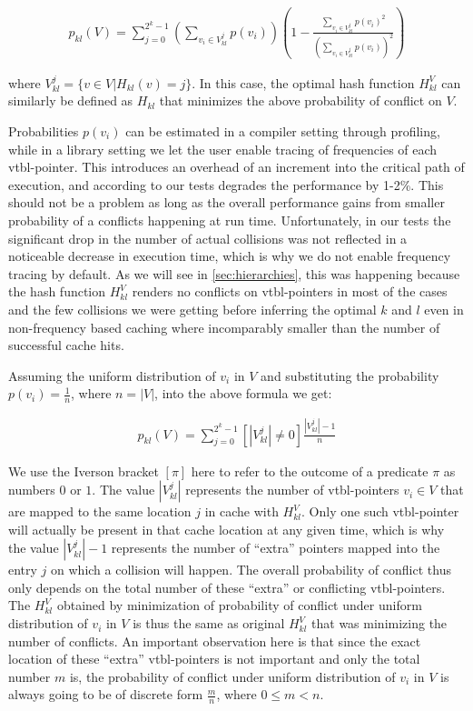\begin{eqnarray*}
p_{kl}(V)=\sum\limits_{j=0}^{2^k-1}(\sum\limits_{v_{i} \in V^j_{kl}}p(v_i))(1-\frac{\sum\limits_{v_i \in V^j_{kl}}p(v_i)^2}{(\sum\limits_{v_{i} \in V^j_{kl}}p(v_i))^2})
\end{eqnarray*}

\noindent 
where $V^j_{kl}=\{v \in V | H_{kl}(v)=j\}$. In this case, the optimal hash 
function $H_{kl}^V$ can similarly be defined as $H_{kl}$ that minimizes the 
above probability of conflict on $V$.

Probabilities $p(v_i)$ can be estimated in a compiler setting through profiling, 
while in a library setting we let the user enable tracing of frequencies of 
each vtbl-pointer. This introduces an overhead of an increment into the critical 
path of execution, and according to our tests degrades the performance by 1-2\%. 
This should not be a problem as long as the overall performance gains from 
smaller probability of a conflicts happening at run time. Unfortunately, in our 
tests the significant drop in the number of actual collisions was not reflected 
in a noticeable decrease in execution time, which is why we do not enable 
frequency tracing by default. As we will see in \textsection\ref{sec:hierarchies}, 
this was happening because the hash function $H_{kl}^V$ renders no conflicts on 
vtbl-pointers in most of the cases and the few collisions we were getting before 
inferring the optimal $k$ and $l$ even in non-frequency based caching where 
incomparably smaller than the number of successful cache hits.

Assuming the uniform distribution of $v_i$ in $V$ and substituting the probability 
$p(v_i)=\frac{1}{n}$, where $n=|V|$, into the above formula we get:

\begin{eqnarray*}
p_{kl}(V)=\sum\limits_{j=0}^{2^k-1}[|V^j_{kl}| \neq 0]\frac{|V^j_{kl}|-1}{n}
\end{eqnarray*}

\noindent
We use the Iverson bracket $[\pi]$ here to refer to the outcome of a predicate $\pi$ as numbers $0$ or $1$.
The value $|V^j_{kl}|$ represents the number of vtbl-pointers $v_i \in V$ that are mapped to the same location $j$ in cache with $H_{kl}^V$. Only 
one such vtbl-pointer will actually be present in that cache location at any given 
time, which is why the value $|V^j_{kl}|-1$ represents the number of ``extra'' 
pointers mapped into the entry $j$ on which a collision will happen. The overall 
probability of conflict thus only depends on the total number of these ``extra'' 
or conflicting vtbl-pointers. The $H_{kl}^V$ obtained by minimization of 
probability of conflict under uniform distribution of $v_i$ in $V$ is thus the 
same as original $H_{kl}^V$ that was minimizing the number of conflicts. An 
important observation here is that since the exact location of these ``extra'' 
vtbl-pointers is not important and only the total number $m$ is, the probability 
of conflict under uniform distribution of $v_i$ in $V$ is always going to be of 
discrete form $\frac{m}{n}$, where $0 \le m < n$.

